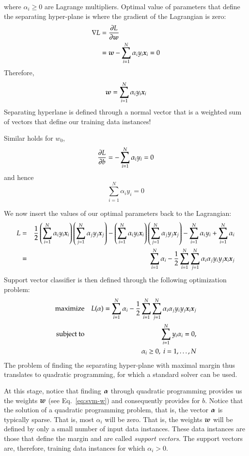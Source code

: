 \begin{refsection}
where $\alpha_i\geq 0$ are Lagrange multipliers. Optimal value of parameters that define the separating hyper-plane is where the gradient of the Lagrangian is zero:
\begin{align*}
\nabla L &= \frac{\partial L}{\partial\boldsymbol{w}} \\
&= \boldsymbol{w} - \sum_{i=1}^N \alpha_i y_i \boldsymbol{x}_i = 0
\end{align*}
Therefore,
\begin{equation}
\boldsymbol{w}=\sum_{i=1}^N \alpha_i y_i \boldsymbol{x}_i
\label{eq:svm-w}
\end{equation}
Separating hyperlane is defined through a normal vector that is a weighted sum of vectors that define our training data instances!

Similar holds for $w_0$,
$$ \frac{\partial L}{\partial b}=-\sum_{i=1}^N \alpha_i y_i = 0 $$
and hence
$$ \sum_{i=1}^N \alpha_i y_i = 0 $$

We now insert the values of our optimal parameters back to the Lagrangian:
\begin{eqnarray*}
L & = & {1\over 2} \left(\sum_{i=1}^N \alpha_i y_i \boldsymbol{x}_i \right) \left(\sum_{j=1}^N \alpha_j y_j \boldsymbol{x}_j \right) - \left(\sum_{i=1}^N \alpha_i y_i \boldsymbol{x}_i \right) \left(\sum_{j=1}^N \alpha_j y_j \boldsymbol{x}_j \right) - \sum_{i=1}^N \alpha_i y_i + \sum_{i=1}^N \alpha_i \\
& = & \sum_{i=1}^N \alpha_i - {1\over 2}\sum_{i=1}^N\sum_{j=1}^N \alpha_i\alpha_j y_i y_j \boldsymbol{x}_i\boldsymbol{x}_j
\end{eqnarray*}
Support vector classifier is then defined through the following optimization problem:
\begin{eqnarray*}
{\rm maximize} && L(\alpha) = \sum_{i=1}^N \alpha_i - {1\over 2}\sum_{i=1}^N\sum_{j=1}^N \alpha_i\alpha_j y_i y_j \boldsymbol{x}_i\boldsymbol{x}_j \\
{\rm subject\ to} && \sum_{i=1}^N y_i\alpha_i = 0, \\
&& \alpha_i\geq 0,\ i=1,\ldots, N
\end{eqnarray*}
The problem of finding the separating hyper-plane with maximal margin thus translates to quadratic programming, for which a standard solver can be used.

At this stage, notice that finding $\boldsymbol{\alpha}$ through quadratic programming provides us the weights $\boldsymbol{w}$ (see Eq.~\ref{eq:svm-w}) and consequently provides for $b$. Notice that the solution of a quadratic programming problem, that is, the vector $\boldsymbol{\alpha}$ is typically sparse. That is, most $\alpha_i$ will be zero. That is, the weights $\boldsymbol{w}$ will be defined by only a small number of input data instances. These data instances are those that define the margin and are called {\em support vectors}. The support vectors are, therefore, training data instances for which $\alpha_i>0$.


\end{refsection}
